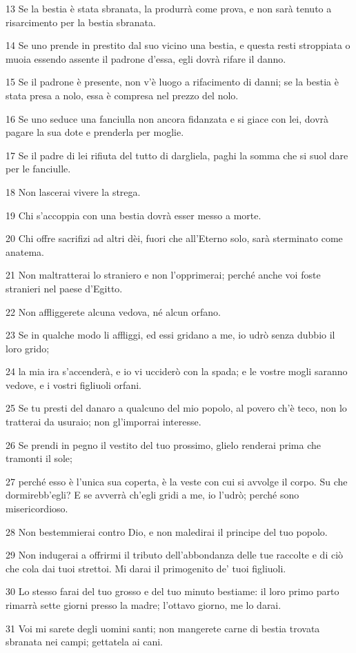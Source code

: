 \par 13 Se la bestia è stata sbranata, la produrrà come prova, e non sarà tenuto a risarcimento per la bestia sbranata.
\par 14 Se uno prende in prestito dal suo vicino una bestia, e questa resti stroppiata o muoia essendo assente il padrone d'essa, egli dovrà rifare il danno.
\par 15 Se il padrone è presente, non v'è luogo a rifacimento di danni; se la bestia è stata presa a nolo, essa è compresa nel prezzo del nolo.
\par 16 Se uno seduce una fanciulla non ancora fidanzata e si giace con lei, dovrà pagare la sua dote e prenderla per moglie.
\par 17 Se il padre di lei rifiuta del tutto di dargliela, paghi la somma che si suol dare per le fanciulle.
\par 18 Non lascerai vivere la strega.
\par 19 Chi s'accoppia con una bestia dovrà esser messo a morte.
\par 20 Chi offre sacrifizi ad altri dèi, fuori che all'Eterno solo, sarà sterminato come anatema.
\par 21 Non maltratterai lo straniero e non l'opprimerai; perché anche voi foste stranieri nel paese d'Egitto.
\par 22 Non affliggerete alcuna vedova, né alcun orfano.
\par 23 Se in qualche modo li affliggi, ed essi gridano a me, io udrò senza dubbio il loro grido;
\par 24 la mia ira s'accenderà, e io vi ucciderò con la spada; e le vostre mogli saranno vedove, e i vostri figliuoli orfani.
\par 25 Se tu presti del danaro a qualcuno del mio popolo, al povero ch'è teco, non lo tratterai da usuraio; non gl'imporrai interesse.
\par 26 Se prendi in pegno il vestito del tuo prossimo, glielo renderai prima che tramonti il sole;
\par 27 perché esso è l'unica sua coperta, è la veste con cui si avvolge il corpo. Su che dormirebb'egli? E se avverrà ch'egli gridi a me, io l'udrò; perché sono misericordioso.
\par 28 Non bestemmierai contro Dio, e non maledirai il principe del tuo popolo.
\par 29 Non indugerai a offrirmi il tributo dell'abbondanza delle tue raccolte e di ciò che cola dai tuoi strettoi. Mi darai il primogenito de' tuoi figliuoli.
\par 30 Lo stesso farai del tuo grosso e del tuo minuto bestiame: il loro primo parto rimarrà sette giorni presso la madre; l'ottavo giorno, me lo darai.
\par 31 Voi mi sarete degli uomini santi; non mangerete carne di bestia trovata sbranata nei campi; gettatela ai cani.

